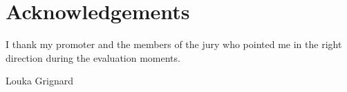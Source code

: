 \chapter*{Acknowledgements} 
I thank my promoter and the members of the jury who pointed me in the right direction during the evaluation moments. 

\hfill Louka Grignard
